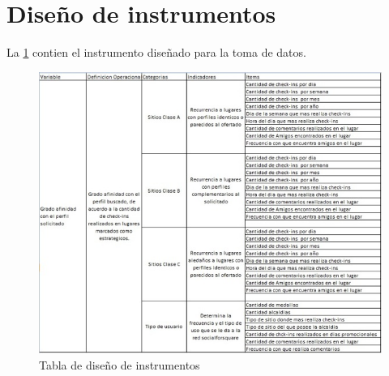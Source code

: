 \section{Dise\~no de instrumentos}
La \ref{fig:instrumentos} contien el instrumento dise\~nado para la toma de datos.
\begin{figure}[h]
\begin{center}
\includegraphics[scale=0.7]{./instrumentos.png}
\end{center}
{\caption{Tabla de dise\~no de instrumentos}\label{fig:instrumentos}}
\end{figure}
\clearpage
\pagebreak